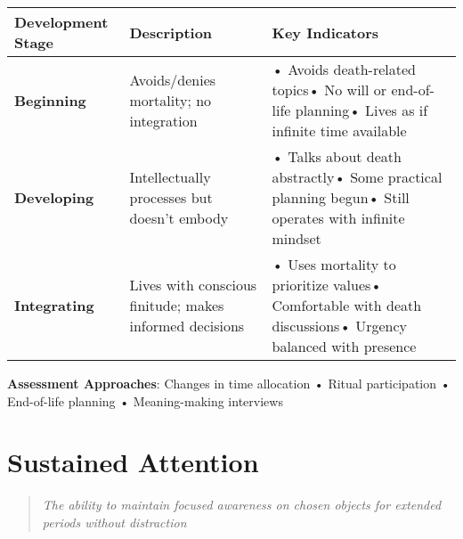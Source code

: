 \documentclass[
  a4paper,
]{report}
\begin{document}
\begin{longtable}[]{@{}
  >{\raggedright\arraybackslash}p{}
  >{\raggedright\arraybackslash}p{}
  >{\raggedright\arraybackslash}p{}@{}}
\toprule\noalign{}
\begin{minipage}[b]{\linewidth}\raggedright
Development Stage
\end{minipage} & \begin{minipage}[b]{\linewidth}\raggedright
Description
\end{minipage} & \begin{minipage}[b]{\linewidth}\raggedright
Key Indicators
\end{minipage} \\
\midrule\noalign{}
\endhead
\bottomrule\noalign{}
\endlastfoot
\textbf{Beginning} & Avoids/denies mortality; no integration & • Avoids
death-related topics• No will or end-of-life planning• Lives as if
infinite time available \\
\textbf{Developing} & Intellectually processes but doesn't embody & •
Talks about death abstractly• Some practical planning begun• Still
operates with infinite mindset \\
\textbf{Integrating} & Lives with conscious finitude; makes informed
decisions & • Uses mortality to prioritize values• Comfortable with
death discussions• Urgency balanced with presence \\
\end{longtable}

\textbf{Assessment Approaches}: Changes in time allocation • Ritual
participation • End-of-life planning • Meaning-making interviews

\section{Sustained Attention}

\begin{quote}
\emph{The ability to maintain focused awareness on chosen objects for
extended periods without distraction}
\end{quote}
\end{document}
